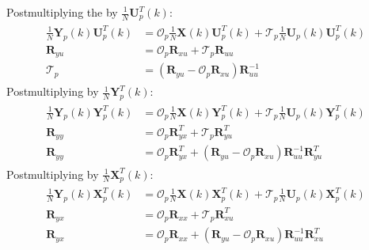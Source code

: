 \documentclass[letterpaper,10pt,english]{sphinxmanual}
\begin{document}
\sphinxAtStartPar
Post\sphinxhyphen{}multiplying the {\hyperref[\detokenize{theory/srim:discrete-time-system-matrix-equation}]{}} by
\(\frac{1}{N}\bm{U}_{p}^{T}(k)\):
\begin{equation*}
\begin{split}\begin{aligned}
\frac{1}{N}\bm{Y}_{p}(k)\bm{U}_{p}^{T}(k) &= \mathcal{O}_{p}\frac{1}{N}\bm{X}(k)\bm{U}_{p}^{T}(k) + \mathcal{T}_{p}\frac{1}{N}\bm{U}_{p}(k)\bm{U}_{p}^{T}(k)
\\
\bm{R}_{yu} &= \mathcal{O}_{p}\bm{R}_{xu} + \mathcal{T}_{p}\bm{R}_{uu}
\\
\mathcal{T}_{p} &= \left( \bm{R}_{yu} - \mathcal{O}_{p}\bm{R}_{xu} \right)\bm{R}_{uu}^{-1}
\end{aligned}\end{split}
\end{equation*}
\sphinxAtStartPar
Post\sphinxhyphen{}multiplying by \(\frac{1}{N}\bm{Y}_{p}^{T}(k)\):
\begin{equation*}
\begin{split}\begin{aligned}
\frac{1}{N}\bm{Y}_{p}(k)\bm{Y}_{p}^{T}(k) &= \mathcal{O}_{p}\frac{1}{N}\bm{X}(k)\bm{Y}_{p}^{T}(k) + \mathcal{T}_{p}\frac{1}{N}\bm{U}_{p}(k)\bm{Y}_{p}^{T}(k)
\\
\bm{R}_{yy} &= \mathcal{O}_{p}\bm{R}_{yx}^{T} + \mathcal{T}_{p}\bm{R}_{yu}^{T}
\\
\bm{R}_{yy} &= \mathcal{O}_{p}\bm{R}_{yx}^{T} + \left( \bm{R}_{yu} - \mathcal{O}_{p}\bm{R}_{xu} \right)\bm{R}_{uu}^{-1}\bm{R}_{yu}^{T}
\end{aligned}\end{split}
\end{equation*}
\sphinxAtStartPar
Post\sphinxhyphen{}multiplying by \(\frac{1}{N}\bm{X}_{p}^{T}(k)\):
\begin{equation*}
\begin{split}\begin{aligned}
\frac{1}{N}\bm{Y}_{p}(k)\bm{X}_{p}^{T}(k) &= \mathcal{O}_{p}\frac{1}{N}\bm{X}(k)\bm{X}_{p}^{T}(k) + \mathcal{T}_{p}\frac{1}{N}\bm{U}_{p}(k)\bm{X}_{p}^{T}(k)
\\
\bm{R}_{yx} &= \mathcal{O}_{p}\bm{R}_{xx} + \mathcal{T}_{p}\bm{R}_{xu}^{T}
\\
\bm{R}_{yx} &= \mathcal{O}_{p}\bm{R}_{xx} + \left( \bm{R}_{yu} - \mathcal{O}_{p}\bm{R}_{xu} \right)\bm{R}_{uu}^{-1}\bm{R}_{xu}^{T}
\end{aligned}\end{split}
\end{equation*}
\end{document}
